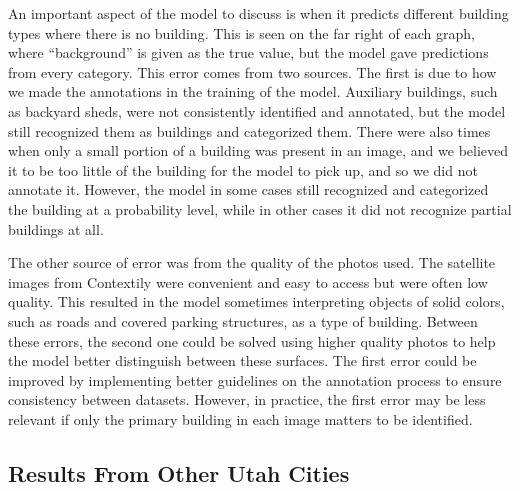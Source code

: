 \documentclass[conference,]{IEEEtran}
\begin{document}
An important aspect of the model to discuss is when it predicts
different building types where there is no building. This is seen on the
far right of each graph, where ``background'' is given as the true
value, but the model gave predictions from every category. This error
comes from two sources. The first is due to how we made the annotations
in the training of the model. Auxiliary buildings, such as backyard
sheds, were not consistently identified and annotated, but the model
still recognized them as buildings and categorized them. There were also
times when only a small portion of a building was present in an image,
and we believed it to be too little of the building for the model to
pick up, and so we did not annotate it. However, the model in some cases
still recognized and categorized the building at a probability level,
while in other cases it did not recognize partial buildings at all.

The other source of error was from the quality of the photos used. The
satellite images from Contextily were convenient and easy to access but
were often low quality. This resulted in the model sometimes
interpreting objects of solid colors, such as roads and covered parking
structures, as a type of building. Between these errors, the second one
could be solved using higher quality photos to help the model better
distinguish between these surfaces. The first error could be improved by
implementing better guidelines on the annotation process to ensure
consistency between datasets. However, in practice, the first error may
be less relevant if only the primary building in each image matters to
be identified.

\subsection{Results From Other Utah
Cities}\label{results-from-other-utah-cities}
\end{document}
